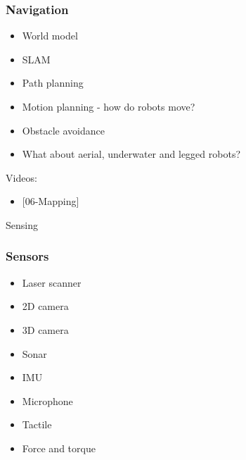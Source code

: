 \documentclass{beamer}
\begin{document}
\begin{frame}
\frametitle{Navigation}
\begin{itemize}
    \item <1->World model
    \item <2->SLAM
    \item <3->Path planning
    \item <4->Motion planning - how do robots move?
    \item <5->Obstacle avoidance
    \item <6->What about aerial, underwater and legged robots?
\end{itemize}

{\footnotesize
Videos:
\begin{itemize}
\item <2->{[06-Mapping]}
\end{itemize}}
\end{frame}

\begin{frame}[standout]
     Sensing
\end{frame}

\begin{frame}
\frametitle{Sensors}
\begin{itemize}
    \item Laser scanner
    \item 2D camera
    \item 3D camera
    \item Sonar
    \item IMU
    \item Microphone
    \item Tactile
    \item Force and torque
\end{itemize}
\end{frame}
\end{document}
